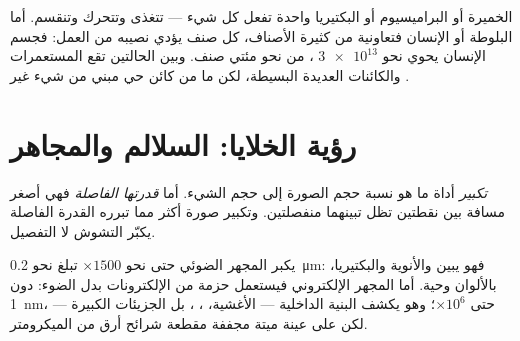 \begin{example}\label{ex:g10:cells-common-unit:onemany}
الخميرة أو البراميسيوم أو البكتيريا  واحدة تفعل كل شيء --- تتغذى
وتتحرك وتنقسم. أما البلوطة أو الإنسان فتعاونية من  كثيرة
الأصناف، كل صنف يؤدي نصيبه من العمل: فجسم الإنسان يحوي نحو
$\num{3e13}$ ، من نحو مئتي صنف. وبين الحالتين تقع المستعمرات
والكائنات العديدة  البسيطة، لكن ما من كائن حي مبني من شيء غير
.
\end{example}

\section{رؤية الخلايا: السلالم والمجاهر}

\begin{definition}\label{def:g10:cells-common-unit:magnification}
\emph{تكبير} أداة ما هو نسبة حجم الصورة إلى حجم الشيء.
أما \emph{قدرتها الفاصلة} فهي أصغر مسافة بين نقطتين
تظل تبينهما منفصلتين. وتكبير صورة أكثر مما تبرره القدرة الفاصلة يكبّر
التشوش لا التفصيل.
\end{definition}

\begin{proposition}\label{prop:g10:cells-common-unit:microscopes}
يكبر المجهر الضوئي حتى نحو $\times 1500$  تبلغ نحو
\qty{0.2}{\micro m}: فهو يبين  والأنوية 
والبكتيريا، بالألوان وحية. أما المجهر الإلكتروني فيستعمل حزمة من
الإلكترونات بدل الضوء:  دون \qty{1}{nm}،  حتى
$\times 10^6$؛ وهو يكشف البنية الداخلية  --- الأغشية،
، ، بل الجزيئات الكبيرة --- لكن على عينة ميتة
مجففة مقطعة شرائح أرق من الميكرومتر.
\end{proposition}
\admitted

